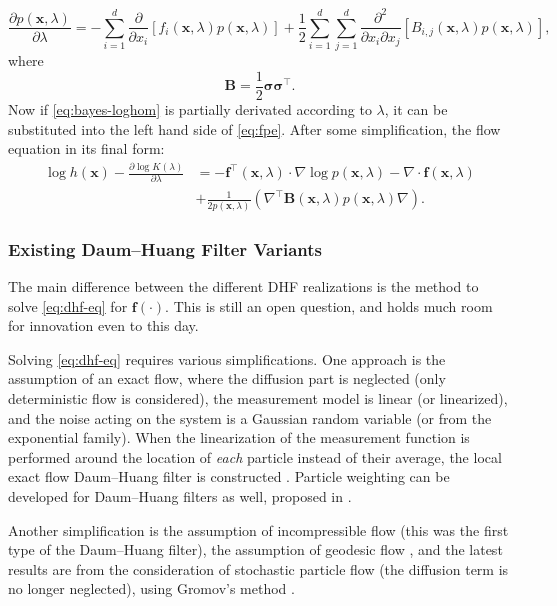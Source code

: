 \begin{equation}\label{eq:fpe}
  \frac{\partial p(\mathbf{x},\lambda)}{\partial \lambda} = -\sum_{i = 1}^{d}\frac{\partial}{\partial x_i}\left[f_i(\mathbf{x},\lambda)p(\mathbf{x},\lambda)\right] + \frac{1}{2}\sum_{i = 1}^{d}\sum_{j = 1}^{d}\frac{\partial^2}{\partial x_i \partial x_j}\left[B_{i,j}(\mathbf{x},\lambda)p(\mathbf{x},\lambda)\right],
\end{equation}
where
\begin{equation}\label{key}
  \mathbf{B} = \frac{1}{2}\boldsymbol\sigma\boldsymbol\sigma^\top.
\end{equation}
Now if \eqref{eq:bayes-loghom} is partially derivated according to $\lambda$, it can be substituted into the left hand side of \eqref{eq:fpe}. After some simplification, the flow equation in its final form:
\begin{align}\label{eq:dhf-eq}
  \log h(\mathbf{x}) - \frac{\partial \log K(\lambda)}{\partial \lambda} & = -\mathbf{f}^\top(\mathbf{x},\lambda)\cdot\nabla\log p(\mathbf{x},\lambda) - \nabla\cdot \mathbf{f}(\mathbf{x},\lambda)       \\
                                                                         & + \frac{1}{2p(\mathbf{x},\lambda)}\left(\nabla^\top\mathbf{B}(\mathbf{x},\lambda)p(\mathbf{x},\lambda)\nabla\right). \nonumber
\end{align}

\subsubsection{Existing Daum--Huang Filter Variants}
The main difference between the different DHF realizations is the method to solve \eqref{eq:dhf-eq} for $\mathbf{f}(\cdot)$. This is still an open question, and holds much room for innovation even to this day.

Solving \eqref{eq:dhf-eq} requires various simplifications. One approach is the assumption of an exact flow, where the diffusion part is neglected (only deterministic flow is considered), the measurement model is linear (or linearized), and the noise acting on the system is a Gaussian random variable (or from the exponential family). When the linearization of the measurement function is performed around the location of \emph{each} particle instead of their average, the local exact flow Daum--Huang filter is constructed \cite{Ding2012}. Particle weighting can be developed for Daum--Huang filters as well, proposed in \cite{Li2016}.

Another simplification is the assumption of incompressible flow \cite{Daum2007}  (this was the first type of the Daum--Huang filter), the assumption of geodesic flow \cite{Daum2013}, and the latest results are from the consideration of stochastic particle flow (the diffusion term is no longer neglected), using Gromov's method \cite{Daum2018,Dai2021}.
